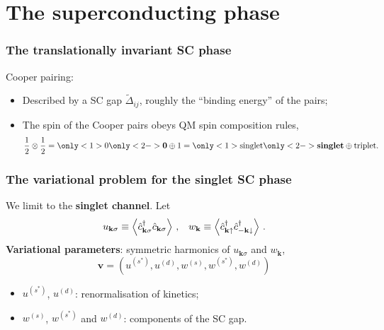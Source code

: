 \section{The superconducting phase}

\begin{frame}
	\frametitle{The translationally invariant SC phase}
	
	Cooper pairing:
	\begin{itemize}
		\item Described by a SC gap $\tilde{\Delta}_{ij}$, roughly the ``binding energy'' of the pairs;
		\item The spin of the Cooper pairs obeys QM spin composition rules,
		\[
			\frac 1 2 \otimes \frac 1 2 = 
				\only<1>{0}
				\only<2->{\mathbf{0}} 
			\oplus 1 = 
				\only<1>{\text{singlet}}
				\only<2->{\text{\bfseries singlet}} 
			\oplus \text{triplet.}
		\]
	\end{itemize}
	
\end{frame}

\begin{frame}
	\frametitle{The variational problem for the singlet SC phase}
	
	We limit to the \textbf{singlet channel}. Let
	\[
		u_{\mathbf{k}\sigma} \equiv \ev{\hat c_{\mathbf{k}\sigma}^\dagger \hat c_{\mathbf{k}\sigma}}
		\, \text{,} \quad
		w_\mathbf{k} \equiv \ev{\hat c_{\mathbf{k}\uparrow}^\dagger \hat c_{-\mathbf{k}\downarrow}^\dagger} \, \text{.}
	\]
	\textbf{Variational parameters}: symmetric harmonics of $u_{\mathbf{k}\sigma}$ and $w_\mathbf{k}$, 
	\[
		\mathbf{v} = \left( u^{(s^*)}, u^{(d)}, w^{(s)}, w^{(s^*)}, w^{(d)} \right)
	\]	
	
	\bigskip
	
	\begin{tabbox}[frametitle=The role of each parameter]
		\begin{itemize}
			\item $u^{(s^*)}$, $u^{(d)}$: renormalisation of kinetics;
			\item $w^{(s)}$, $w^{(s^*)}$ and $w^{(d)}$: components of the SC gap.
		\end{itemize}
	\end{tabbox}
	
\end{frame}

